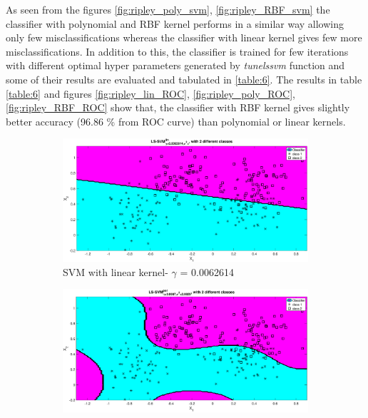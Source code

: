 \documentclass[12pt]{report}
\begin{document}
{As seen from the figures \ref{fig:ripley_poly_svm}, \ref{fig:ripley_RBF_svm} the classifier with polynomial and RBF kernel performs in a similar way allowing only few misclassifications whereas the classifier with linear kernel gives few more misclassifications. In addition to this, the classifier is trained for few iterations with different optimal hyper parameters generated by \textit{tunelssvm} function and some of their results are evaluated and tabulated in \ref{table:6}. The results in table \ref{table:6} and  figures \ref{fig:ripley_lin_ROC}, \ref{fig:ripley_poly_ROC}, \ref{fig:ripley_RBF_ROC} show that, the classifier with RBF kernel gives slightly better accuracy (96.86 \% from ROC curve) than polynomial or linear kernels.
\begin{figure}[!ht] 
	\centering
	\begin{subfigure}{.35\textwidth}
		\centering
		\captionsetup{width=0.8\linewidth}
		\includegraphics[height=.65\linewidth, width=0.9\linewidth]{ripley/ripley_lin_svm.eps}
		\caption{SVM with linear kernel- $\gamma$ = 0.0062614 }
		\label{fig:ripley_lin_svm}
	\end{subfigure}%
	\begin{subfigure}{.35\textwidth}
		\centering
		\captionsetup{width=0.8\linewidth}
		\includegraphics[height=.65\linewidth, width=0.9\linewidth]{ripley/ripley_ploy_svm.eps}

\end{subfigure}
\end{figure}}
\end{document}
